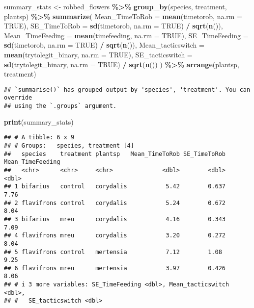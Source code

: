 \documentclass[
]{article}
\newenvironment{Shaded}{\begin{snugshade}}{\end{snugshade}}
\newcommand{\AttributeTok}[1]{\textcolor[rgb]{0.13,0.29,0.53}{#1}}
\newcommand{\ConstantTok}[1]{\textcolor[rgb]{0.56,0.35,0.01}{#1}}
\newcommand{\FunctionTok}[1]{\textcolor[rgb]{0.13,0.29,0.53}{\textbf{#1}}}
\newcommand{\NormalTok}[1]{#1}
\newcommand{\OtherTok}[1]{\textcolor[rgb]{0.56,0.35,0.01}{#1}}
\newcommand{\SpecialCharTok}[1]{\textcolor[rgb]{0.81,0.36,0.00}{\textbf{#1}}}
\begin{document}
\begin{Shaded}
\begin{Highlighting}[]
\NormalTok{summary\_stats }\OtherTok{\textless{}{-}}\NormalTok{ robbed\_flowers }\SpecialCharTok{\%\textgreater{}\%}
  \FunctionTok{group\_by}\NormalTok{(species, treatment, plantsp) }\SpecialCharTok{\%\textgreater{}\%}
  \FunctionTok{summarize}\NormalTok{(}
    \AttributeTok{Mean\_TimeToRob =} \FunctionTok{mean}\NormalTok{(timetorob, }\AttributeTok{na.rm =} \ConstantTok{TRUE}\NormalTok{),}
    \AttributeTok{SE\_TimeToRob =} \FunctionTok{sd}\NormalTok{(timetorob, }\AttributeTok{na.rm =} \ConstantTok{TRUE}\NormalTok{) }\SpecialCharTok{/} \FunctionTok{sqrt}\NormalTok{(}\FunctionTok{n}\NormalTok{()),}
    \AttributeTok{Mean\_TimeFeeding =} \FunctionTok{mean}\NormalTok{(timefeeding, }\AttributeTok{na.rm =} \ConstantTok{TRUE}\NormalTok{),}
    \AttributeTok{SE\_TimeFeeding =} \FunctionTok{sd}\NormalTok{(timetorob, }\AttributeTok{na.rm =} \ConstantTok{TRUE}\NormalTok{) }\SpecialCharTok{/} \FunctionTok{sqrt}\NormalTok{(}\FunctionTok{n}\NormalTok{()),}
    \AttributeTok{Mean\_tacticswitch =} \FunctionTok{mean}\NormalTok{(trytolegit\_binary, }\AttributeTok{na.rm =} \ConstantTok{TRUE}\NormalTok{),}
    \AttributeTok{SE\_tacticswitch =} \FunctionTok{sd}\NormalTok{(trytolegit\_binary, }\AttributeTok{na.rm =} \ConstantTok{TRUE}\NormalTok{) }\SpecialCharTok{/} \FunctionTok{sqrt}\NormalTok{(}\FunctionTok{n}\NormalTok{())}
\NormalTok{  ) }\SpecialCharTok{\%\textgreater{}\%} 
  \FunctionTok{arrange}\NormalTok{(plantsp, treatment)}
\end{Highlighting}
\end{Shaded}

\begin{verbatim}
## `summarise()` has grouped output by 'species', 'treatment'. You can override
## using the `.groups` argument.
\end{verbatim}

\begin{Shaded}
\begin{Highlighting}[]
\FunctionTok{print}\NormalTok{(summary\_stats)}
\end{Highlighting}
\end{Shaded}

\begin{verbatim}
## # A tibble: 6 x 9
## # Groups:   species, treatment [4]
##   species    treatment plantsp   Mean_TimeToRob SE_TimeToRob Mean_TimeFeeding
##   <chr>      <chr>     <chr>              <dbl>        <dbl>            <dbl>
## 1 bifarius   control   corydalis           5.42        0.637             7.76
## 2 flavifrons control   corydalis           5.24        0.672             8.04
## 3 bifarius   mreu      corydalis           4.16        0.343             7.09
## 4 flavifrons mreu      corydalis           3.20        0.272             8.04
## 5 flavifrons control   mertensia           7.12        1.08              9.25
## 6 flavifrons mreu      mertensia           3.97        0.426             8.06
## # i 3 more variables: SE_TimeFeeding <dbl>, Mean_tacticswitch <dbl>,
## #   SE_tacticswitch <dbl>
\end{verbatim}
\end{document}
